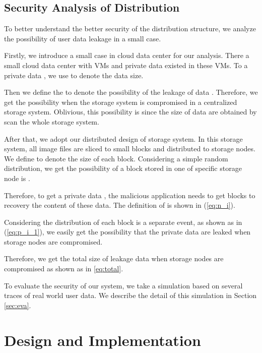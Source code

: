 \documentclass[conference]{IEEEtran}
\begin{document}
\subsection{Security Analysis of Distribution}
To better understand the better security of the distribution structure, we analyze the possibility of user data leakage in a small case. 

Firstly, we introduce a small case in cloud data center for our analysis. There a small cloud data center with  VMs and  private data existed in these VMs. To a private data , we use  to denote the data size. 

Then we define the  to denote the possibility of the leakage of data . Therefore, we get the possibility  when the storage system is compromised in a centralized storage system. Oblivious, this possibility is  since the  size of data are obtained by scan the whole storage system.

After that, we adopt our distributed design of storage system. In this storage system, all image files are sliced to small blocks and distributed to  storage nodes. We define  to denote the size of each block. Considering a simple random distribution, we get the possibility of a block stored in one of  specific storage node is . 

Therefore, to get a private data , the malicious application needs to get  blocks to recovery the content of these data. The definition of  is shown in (\ref{eq:n_i}).

  

Considering the distribution of each block is a separate event, as shown as in (\ref{eq:p_i_1}), we easily get the possibility  that the private data  are leaked when  storage nodes are compromised. 



Therefore, we get the total size  of leakage data when  storage nodes are compromised as shown as in \ref{eq:total}.



To evaluate the security of our system, we take a simulation based on several traces of real world user data. We describe the detail of this simulation in Section \ref{sec:eva}.










\section{Design and Implementation}
\label{sec:implementation}
\end{document}
